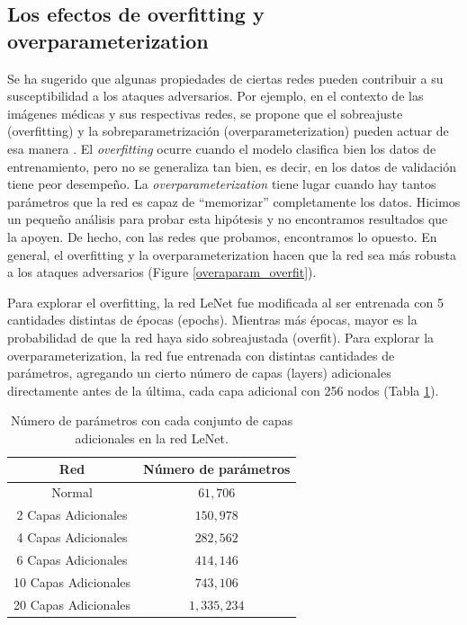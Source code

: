 \pagebreak

\subsection{Los efectos de overfitting y overparameterization}

Se ha sugerido que algunas propiedades de ciertas redes pueden contribuir a su susceptibilidad a los ataques adversarios. Por ejemplo, en el contexto de las imágenes médicas y sus respectivas redes, se propone que el sobreajuste (overfitting) y la sobreparametrización (overparameterization) pueden actuar de esa manera \cite{ma2020understanding}. El \textit{overfitting} ocurre cuando el modelo clasifica bien los datos de entrenamiento, pero no se generaliza tan bien, es decir, en los datos de validación tiene peor desempeño. La \textit{overparameterization} tiene lugar cuando hay tantos parámetros que la red es capaz de ``memorizar'' completamente los datos. Hicimos un pequeño análisis para probar esta hipótesis y no encontramos resultados que la apoyen. De hecho, con las redes que probamos, encontramos lo opuesto. En general, el overfitting y la overparameterization hacen que la red sea más robusta a los ataques adversarios (Figure \ref{overaparam_overfit}).

Para explorar el overfitting, la red LeNet fue modificada al ser entrenada con 5 cantidades distintas de épocas (epochs). Mientras más épocas, mayor es la probabilidad de que la red haya sido sobreajustada (overfit). Para explorar la overparameterization, la red fue entrenada con distintas cantidades de parámetros, agregando un cierto número de capas (layers) adicionales directamente antes de la última, cada capa adicional con 256 nodos (Tabla \ref{overparam_table}).

\renewcommand{\tablename}{Tabla}
\begin{table}[h]
    \centering
    \begin{tabular}{|c|c|}
     \hline
     Red & Número de parámetros  \\ 
     \hline
     Normal & $61,706$  \\ 
     \hline
     2 Capas Adicionales & $150,978$  \\ 
     \hline
     4 Capas Adicionales & $282,562$  \\ 
     \hline
     6 Capas Adicionales & $414,146$  \\ 
     \hline
     10 Capas Adicionales & $743,106$  \\ 
     \hline
     20 Capas Adicionales & $1,335,234$  \\ 
     \hline
    \end{tabular}
    \caption{Número de parámetros con cada conjunto de capas adicionales en la red LeNet.}
    \label{overparam_table}
\end{table}

